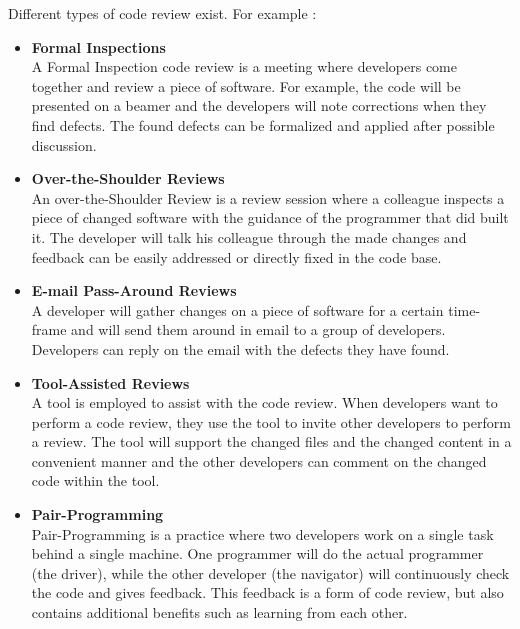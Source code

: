 Different types of code review exist. For example \autocite[23--38]{cohen2006best}:
\begin{itemize}
\setlength\itemsep{0em}
\item \textbf{Formal Inspections} \autocite[23]{cohen2006best}\\
A Formal Inspection code review is a meeting where developers come together and review a piece of software.
For example, the code will be presented on a beamer and the developers will note corrections when they find defects.
The found defects can be formalized and applied after possible discussion.
\item \textbf{Over-the-Shoulder Reviews} \autocite[26]{cohen2006best}\\
An over-the-Shoulder Review is a review session where a colleague inspects a piece of changed software with the guidance of the programmer that did built it.
The developer will talk his colleague through the made changes and feedback can be easily addressed or directly fixed in the code base.
\item \textbf{E-mail Pass-Around Reviews} \autocite[30]{cohen2006best}\\
A developer will gather changes on a piece of software for a certain time-frame and will send them around in email to a group of developers.
Developers can reply on the email with the defects they have found.
\item \textbf{Tool-Assisted Reviews} \autocite[34]{cohen2006best}\\
A tool is employed to assist with the code review.
When developers want to perform a code review, they use the tool to invite other developers to perform a review.
The tool will support the changed files and the changed content in a convenient manner and the other developers can comment on the changed code within the tool.
\item \textbf{Pair-Programming} \autocite[37]{cohen2006best}\\
Pair-Programming is a practice where two developers work on a single task behind a single machine.
One programmer will do the actual programmer (the driver), while the other developer (the navigator) will continuously check the code and gives feedback.
This feedback is a form of code review, but also contains additional benefits such as learning from each other.
\end{itemize}

